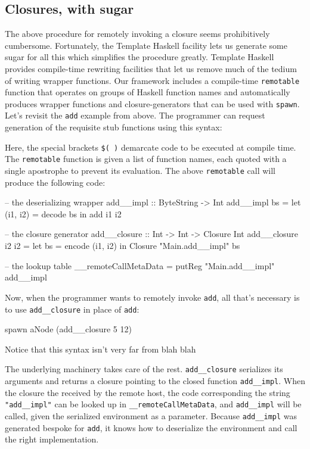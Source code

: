 \documentclass[preprint]{sigplanconf}
\begin{document}
\subsection{Closures, with sugar}

The above procedure for remotely invoking a closure seems prohibitively cumbersome. Fortunately, the Template Haskell facility lets us generate some sugar for all this which simplifies the procedure greatly. Template Haskell provides compile-time rewriting facilities that let us remove much of the tedium of writing wrapper functions. Our framework includes a compile-time \texttt{remotable} function that operates on groups of Haskell function names and automatically produces wrapper functions and closure-generators that can be used with \texttt{spawn}. Let's revisit the \texttt{add} example from above. The programmer can request generation of the requisite stub functions using this syntax:


Here, the special brackets \texttt{\$( )} demarcate code to be executed at compile time. The \texttt{remotable} function is given a list of function names, each quoted with a single apostrophe to prevent its evaluation. The above \texttt{remotable} call will produce the following code:

\begin{code}
-- the deserializing wrapper
add__impl :: ByteString -> Int
add__impl bs = let (i1, i2) = decode bs
                in add i1 i2

-- the closure generator
add__closure :: Int -> Int -> Closure Int
add__closure i2 i2 = let bs = encode (i1, i2)
                      in Closure "Main.add__impl" bs

-- the lookup table
__remoteCallMetaData = putReg "Main.add__impl" add__impl
\end{code}

Now, when the programmer wants to remotely invoke \texttt{add}, all that's necessary is to use \texttt{add\_\_closure} in place of \texttt{add}:

\begin{code}
spawn aNode (add__closure 5 12)
\end{code}

Notice that this syntax isn't very far from blah blah

The underlying machinery takes care of the rest. \texttt{add\_\_closure} serializes its arguments and returns a closure pointing to the closed function \texttt{add\_\_impl}. When the closure the received by the remote host, the code corresponding the string \texttt{"add\_\_impl"} can be looked up in \texttt{\_\_remoteCallMetaData}, and \texttt{add\_\_impl} will be called, given the serialized environment as a parameter. Because \texttt{add\_\_impl} was generated bespoke for \texttt{add}, it knows how to deserialize the environment and call the right implementation.
\end{document}
